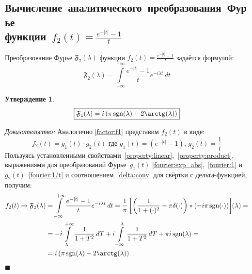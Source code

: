 \documentclass[11pt, oneside, final]{article}
\theoremstyle{break}
\numberwithin{equation}{section}
\theoremstyle{plain}
\newtheorem*{statement}{Утверждение}
\theoremstyle{definition}
\renewenvironment{proof}{
\noindent\textit{Доказательство: }} {\qed}
\newcommand \rarrow{\rightarrow}
\newcommand \intinf[1][{\,dt}]{ \int\limits_{-\infty}^{+\infty}{{#1}}}
\renewcommand \qed{$\blacksquare$}
\DeclareMathOperator{\sgn}{sgn}
\begin{document}
       \subsection{Вычисление~аналитического~преобразования~Фурье\\функции~\(f_2(t) = \frac{e^{-|t|} - 1}{t} \)}
       Преобразование Фурье \( \mathfrak{F_2} (\lambda)\) функции \(f_2(t) = \frac{e^{-|t|} - 1}{t} \) задаётся формулой:
       \[ \mathfrak{F_2} (\lambda) = \intinf[{\dfrac{e^{-|t|} - 1}{t} e^{-i\lambda t}\, dt}] \]
       \begin{statement}
           \begin{equation}\label{eq:fourier:f2} 
               \boxed{ \mathfrak{F_2}(\lambda) = i\left(\pi\sgn(\lambda) - 2\arctg(\lambda)\right) } 
           \end{equation}
       \end{statement}
       \begin{proof}
           Аналогично \eqref{factor:f1} представим \(f_2(t) \) в виде: 
           \begin{equation}\label{factor:f2} 
               f_2(t) = g_1(t) \cdot g_2(t) \text{ где } g_1(t) = \left(e^{-|t|} - 1\right)\text{, } g_2(t) = \dfrac{1}{t} 
           \end{equation}
           Пользуясь установленными свойствами~\ref{property:linear},~\ref{property:product}, выражениями для преобразований Фурье~\(g_1(t)\) \eqref{fourier:exp_abs},~\eqref{fourier:1} и~\(g_2(t)\)~\eqref{fourier:1/t} и соотношением~\eqref{delta:conv} для свёртки с дельта-функцией, получим:
           \[ 
           \begin{split} 
               f_2(t) \rarrow \mathfrak{F_2} (\lambda) &= \intinf[{ \dfrac{e^{-|t|} - 1}{t} e^{-i\lambda t}\, dt}] = 
               \dfrac{1}{\pi}\left[\left({\dfrac{1}{1 + (\cdot)^2} - \pi\delta(\cdot)}\right) * \left({-i \pi \sgn(\cdot)}\right)\right] \negmedspace({\lambda}) = \\
               &= -i\int\limits_{\lambda}^{+\infty}{\dfrac{1}{1 + T^2}\, dT} + i\int\limits_{-\infty}^{\lambda}{\dfrac{1}{1 + T^2}\, dT} + \pi i \sgn(\lambda) = \\
               &= i\left(\pi \sgn(\lambda) - 2\arctg(\lambda)\right) 
           \end{split}
           \]
       \end{proof}
       \clearpage
\end{document}
